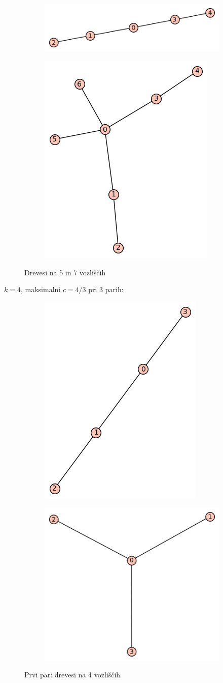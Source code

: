 \documentclass[12pt, a4paper]{article}
\begin{document}
\begin{figure}[!htb]
\centering
\begin{subfigure}{0.5\textwidth}
  \centering
  \includegraphics[width=0.5\linewidth]{t-5}
\end{subfigure}%
\begin{subfigure}{0.5\textwidth}
  \centering
  \includegraphics[width=0.35\linewidth]{t-22}
\end{subfigure}
\caption{Drevesi na 5 in 7 vozliščih}
\label{fig:test}
\end{figure}


$k=4$, maksimalni $c=4/3$ pri 3 parih:\\

\begin{figure}[!htb]
\centering
\begin{subfigure}{0.5\textwidth}
  \centering
  \includegraphics[width=0.3\linewidth]{t-3}
\end{subfigure}%
\begin{subfigure}{0.5\textwidth}
  \centering
  \includegraphics[width=0.4\linewidth]{t-4}
\end{subfigure}
\caption{Prvi par: drevesi na 4 vozliščih}
\label{fig:test}
\end{figure}
\end{document}
